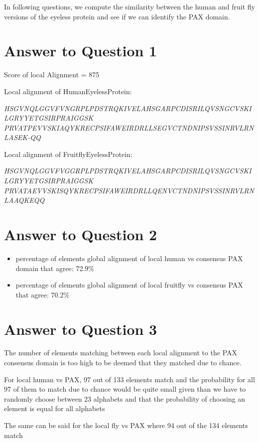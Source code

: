 \documentclass[a4paper]{article}
\begin{document}
In following questions, we compute the similarity between the human and fruit fly versions of the eyeless protein and see if we can identify the PAX domain.

\section*{Answer to Question 1}
Score of local Alignment = 875

Local alignment of HumanEyelessProtein:

\textit{HSGVNQLGGVFVNGRPLPDSTRQKIVELAHSGARPCDISRILQVSNGCVSKILGRYYETGSIRPRAIGGSK\\
PRVATPEVVSKIAQYKRECPSIFAWEIRDRLLSEGVCTNDNIPSVSSINRVLRNLASEK-QQ}

Local alignment of FruitflyEyelessProtein:

\textit{HSGVNQLGGVFVGGRPLPDSTRQKIVELAHSGARPCDISRILQVSNGCVSKILGRYYETGSIRPRAIGGSK
\\
PRVATAEVVSKISQYKRECPSIFAWEIRDRLLQENVCTNDNIPSVSSINRVLRNLAAQKEQQ}


%

\section*{Answer to Question 2}
\begin{itemize}
    \item percentage of elements global alignment of local human vs consensus PAX domain that agree: 72.9\%
    \item percentage of elements global alignment of local fruitfly vs consensus PAX that agree: 70.2\%
\end{itemize}



\section*{Answer to Question 3}
The number of elements matching between each local alignment to the PAX 
consensus domain is too high to be deemed that they matched due to chance.

For local human vs PAX, 97 out of 133 elements match and the probability
for all 97 of them to match due to chance would be quite small given than we have to randomly choose between 23 alphabets and that the probability of choosing an element is equal for all alphabets

The same can be said for the local fly vs PAX where 94 out of the 134 elements match
\end{document}
